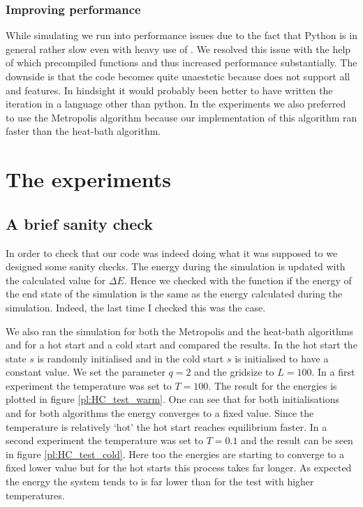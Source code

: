 \subsubsection{Improving performance}

While simulating we run into performance issues due to the fact that Python is in general rather slow even with heavy use of . We resolved this issue with the help of  which precompiled functions and thus increased performance substantially. The downside is that the code becomes quite unaestetic because  does not support all  and  features. In hindsight it would probably been better to have written the iteration in a language other than python.
In the experiments we also preferred to use the Metropolis algorithm because our implementation of this algorithm ran faster than the heat-bath algorithm.

\section{The experiments}

\subsection{A brief sanity check}

In order to check that our code was indeed doing what it was supposed to we designed some sanity checks. 
The energy during the simulation is updated with the calculated value for $\Delta E$.
Hence we checked with the function  if the energy of the end state of the simulation is the same as the energy calculated during the simulation. Indeed, the last time I checked this was the case.

We also ran the simulation for both the Metropolis and the heat-bath algorithms and for a hot start and a cold start and compared the results. In the hot start the state $s$ is randomly initialised and in the cold start $s$ is initialised to have a constant value. We set the parameter $q=2$ and the gridsize to $L=100$. In a first experiment the temperature was set to $T=100$. The result for the energies is plotted in figure \ref{pl:HC_test_warm}. One can see that for both initialisations and for both algorithms the energy converges to a fixed value. Since the temperature is relatively `hot' the hot start reaches equilibrium faster. In a second experiment the temperature was set to $T=0.1$ and the result can be seen in figure \ref{pl:HC_test_cold}. Here too the energies are starting to converge to a fixed lower value but for the hot starts this process takes far longer. As expected the energy the system tends to is far lower than for the test with higher temperatures. 


